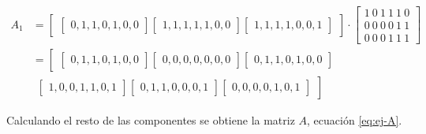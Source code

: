 \begin{equation}\label{eq:ej-A-1}
	\begin{aligned}
	{A_1} & = \left[\begin{array}{c}
		\left[\begin{array}{c}
			0, 1, 1, 0, 1, 0, 0
		\end{array}\right]
	
		\left[\begin{array}{c}
			1, 1, 1, 1, 1, 0, 0
		\end{array}\right]
		\left[\begin{array}{c}
			1, 1, 1, 1, 0, 0, 1
		\end{array}\right]
		\end{array}\right]
		\cdot
		\left[\begin{array}{c}
			1\ 0\ 1\ 1\ 1\ 0\\
			0\ 0\ 0\ 0\ 1\ 1\\
			0\ 0\ 0\ 1\ 1\ 1
		\end{array}\right]\\
		& = \left[\begin{array}{c}
				\left[\begin{array}{c}
					0, 1, 1, 0, 1, 0, 0
				\end{array}\right]
		
				\left[\begin{array}{c}
					0, 0, 0, 0, 0, 0, 0
				\end{array}\right]
		
				\left[\begin{array}{c}
					0, 1, 1, 0, 1, 0, 0
				\end{array}\right]
			\end{array}\right. \\
			&
			\left. \begin{array}{c}
				\left[\begin{array}{c}
					1, 0, 0, 1, 1, 0, 1
				\end{array}\right]
				\left[\begin{array}{c}
					0, 1, 1, 0, 0, 0, 1
				\end{array}\right]
				\left[\begin{array}{c}
					0, 0, 0, 0, 1, 0, 1
				\end{array}\right]
			\end{array}\right]
	\end{aligned}
\end{equation}

Calculando el resto de las componentes se obtiene la matriz $A$, ecuación \ref{eq:ej-A}.

